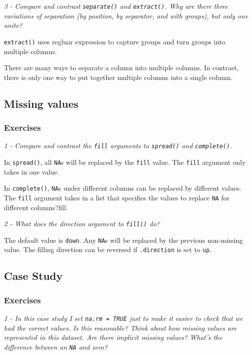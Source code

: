 \documentclass[]{article}
\theoremstyle{definition}
\theoremstyle{definition}
\theoremstyle{definition}
\theoremstyle{remark}
\begin{document}
\emph{3 - Compare and contrast \texttt{separate()} and
\texttt{extract()}. Why are there three variations of separation (by
position, by separator, and with groups), but only one unite?}

\texttt{extract()} uses regluar expression to capture groups and turn
groups into multiple columns.

There are many ways to separate a column into multiple columns. In
contrast, there is only one way to put together multiple columns into a
single column.

\subsection{Missing values}\label{missing-values-1}

\subsubsection{Exercises}\label{exercises-24}

\emph{1 - Compare and contrast the \texttt{fill} arguments to
\texttt{spread()} and \texttt{complete()}.}

In \texttt{spread()}, all \texttt{NA}s will be replaced by the
\texttt{fill} value. The \texttt{fill} argument only takes in one value.

In \texttt{complete()}, \texttt{NA}s under different columns can be
replaced by different values. The \texttt{fill} argument takes in a list
that specifies the values to replace \texttt{NA} for different
columns?fill.

\emph{2 - What does the direction argument to \texttt{fill()} do?}

The default value is \texttt{down}. Any \texttt{NA}s will be replaced by
the previous non-missing value. The filling direction can be reversed if
\texttt{.direction} is set to \texttt{up}.

\subsection{Case Study}\label{case-study}

\subsubsection{Exercises}\label{exercises-25}

\emph{1 - In this case study I set \texttt{na.rm\ =\ TRUE} just to make
it easier to check that we had the correct values. Is this reasonable?
Think about how missing values are represented in this dataset. Are
there implicit missing values? What's the difference between an
\texttt{NA} and zero?}
\end{document}
